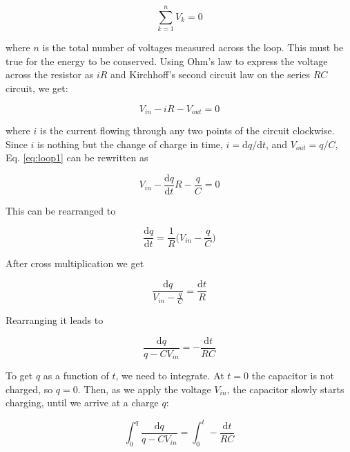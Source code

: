\begin{equation}
\label{eq:kirchoff}
	\sum_{k=1}^{n} V_k = 0
\end{equation}

where $n$ is the total number of voltages measured across the loop.
This must be true for the energy to be conserved.
Using Ohm's law to express the voltage across the resistor as $iR$ and Kirchhoff's second circuit law on the series $RC$ circuit, we get:

\begin{equation}
\label{eq:loop1}
	V_{in} - iR - V_{out} = 0
\end{equation}

where $i$ is the current flowing through any two points of the circuit clockwise.
Since $i$ is nothing but the change of charge in time, $i = \mathrm{d}q / \mathrm{d}t$, and $V_{out} = q / C$, Eq. \ref{eq:loop1} can be rewritten as

\begin{equation}
\label{eq:loop2}
        V_{in} - \frac{\mathrm{d}q}{\mathrm{d}t}R - \frac{q}{C} = 0
\end{equation}

This can be rearranged to

\begin{equation}
\label{eq:loop3}
        \frac{\mathrm{d}q}{\mathrm{d}t} = \frac{1}{R}\bigg(V_{in} - \frac{q}{C}\bigg)
\end{equation}

After cross multiplication we get

\begin{equation}
\label{eq:loop4}
        \frac{\mathrm{d}q}{V_{in}-\displaystyle{\frac{q}{C}}} = \frac{\mathrm{d}t}{R}
\end{equation}

Rearranging it leads to

\begin{equation}
\label{eq:loop5}
        \frac{\mathrm{d}q}{q - CV_{in}} = - \frac{\mathrm{d}t}{RC}
\end{equation}

To get $q$ as a function of $t$, we need to integrate.
At $t = 0$ the capacitor is not charged, so $q = 0$.
Then, as we apply the voltage $V_{in}$, the capacitor slowly starts charging, until we arrive at a charge $q$:

\begin{equation}
\label{eq:loop6}
        \int_{0}^{q} \frac{\mathrm{d}q}{q - CV_{in}} = \int_{0}^{t} - \frac{\mathrm{d}t}{RC}
\end{equation}

